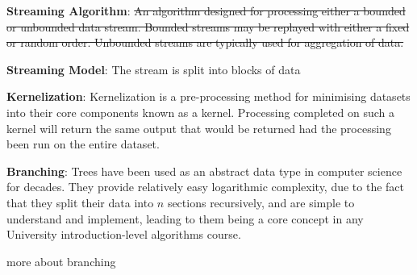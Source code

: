 \textbf{Streaming Algorithm}: \sout{An algorithm designed for processing either
    a bounded or unbounded data stream. Bounded streams may be replayed with
    either a fixed or random order. Unbounded streams are typically used for
    aggregation of data.}

\textbf{Streaming Model}: The stream is split into blocks of data

\textbf{Kernelization}: Kernelization is a pre-processing method for minimising
datasets into their core components known as a kernel. Processing completed on
such a kernel will return the same output that would be returned had the
processing been run on the entire dataset.

\textbf{Branching}: Trees have been used as an abstract data type in computer
science for decades. They provide relatively easy logarithmic complexity, due
to the fact that they split their data into \(n\) sections recursively, and are
simple to understand and implement, leading to them being a core concept in any
University introduction-level algorithms course.

more about branching
